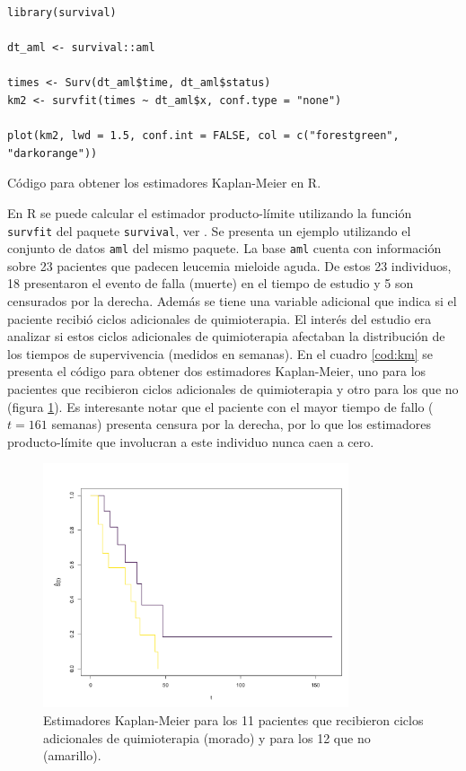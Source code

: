 \documentclass[11pt,a4paper]{article}
\begin{document}
 \begin{table}[htb]
\begin{lstlisting}
library(survival)

dt_aml <- survival::aml

times <- Surv(dt_aml$time, dt_aml$status)
km2 <- survfit(times ~ dt_aml$x, conf.type = "none")

plot(km2, lwd = 1.5, conf.int = FALSE, col = c("forestgreen", "darkorange"))
\end{lstlisting}
\caption{Código para obtener los estimadores Kaplan-Meier en R.}
\label{cod:km}
\end{table}

 En R se puede calcular el estimador producto-límite utilizando la función \texttt{survfit} del paquete \texttt{survival}, ver \citet{survival-book}. Se presenta un ejemplo utilizando el conjunto de datos \texttt{aml} del mismo paquete. La base \texttt{aml} cuenta con información sobre 23 pacientes que padecen leucemia mieloide aguda. De estos 23 individuos, 18 presentaron el evento de falla (muerte) en el tiempo de estudio y 5 son censurados por la derecha. Además se tiene una variable adicional que indica si el paciente recibió ciclos adicionales de quimioterapia. El interés del estudio era analizar si estos ciclos adicionales de quimioterapia afectaban la distribución de los tiempos de supervivencia (medidos en semanas). En el cuadro \ref{cod:km} se presenta el código para obtener dos estimadores Kaplan-Meier, uno para los pacientes que recibieron ciclos adicionales de quimioterapia y otro para los que no (figura \ref{fig:km2}). Es interesante notar que el paciente con el mayor tiempo de fallo ($t = 161$ semanas) presenta censura por la derecha, por lo que los estimadores producto-límite que involucran a este individuo nunca caen a cero.
 
 \begin{figure}[hbt]
\centering\includegraphics[width=9cm]{km2.png}
\caption{Estimadores Kaplan-Meier para los 11 pacientes que recibieron ciclos adicionales de quimioterapia (morado) y para los 12 que no (amarillo).}
\label{fig:km2}
\end{figure}
\end{document}
